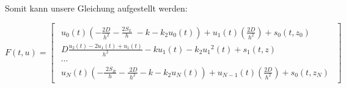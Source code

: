 Somit kann unsere Gleichung aufgestellt werden:

\begin{equation}
		F(t,u)= 
\begin{bmatrix}
	\begin{array}{c}
		u_0 \left(t\right)\left(-\frac{2D}{h^2 }-\frac{{2S}_L }{h}\;-k-k_2 u_0 \left(t\right)\right)+u_1 \left(t\right)\left(\frac{2D}{h^2 }\right)+s_0 \left(t,z_0 \right)\;\\
		D\frac{u_2 \left(t\right)-{2u}_1 \left(t\right)+u_1 \left(t\right)}{h^2 }-ku_1 \left(t\right)-k_2 {u_1 }^2 \left(t\right)+s_1 \left(t,z\right)\\
		\cdots \\
		u_N \left(t\right)\left(-\frac{\;2S_R }{h}-\frac{\;2D}{h^2 }-k-k_2 u_N \left(t\right)\right)+u_{N-1} \left(t\right)\left(\frac{2D}{h^2 }\right)+s_0 \left(t,z_N \right)
	\end{array}
\end{bmatrix}  
\end{equation}
